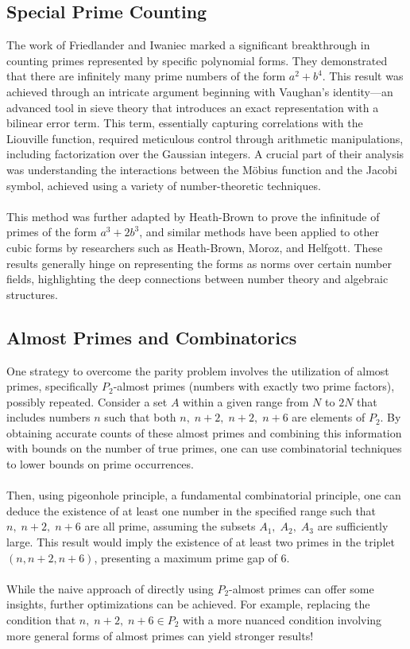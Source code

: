 \documentclass[10pt]{extarticle}
\begin{document}
\subsection{Special Prime Counting}
The work of Friedlander and Iwaniec marked a significant breakthrough in counting primes represented by specific polynomial forms. They demonstrated that there are infinitely many prime numbers of the form $a^2 + b^4$. 
This result was achieved through an intricate argument beginning with Vaughan’s identity—an advanced tool in sieve theory that introduces an exact representation with a bilinear error term. This term, essentially capturing correlations with the Liouville function, required meticulous control through arithmetic manipulations, including factorization over the Gaussian integers. A crucial part of their analysis was understanding the interactions between the Möbius function and the Jacobi symbol, achieved using a variety of number-theoretic techniques.\\
\\
This method was further adapted by Heath-Brown to prove the infinitude of primes of the form $a^3 + 2b^3$, and similar methods have been applied to other cubic forms by researchers such as Heath-Brown, Moroz, and Helfgott. These results generally hinge on representing the forms as norms over certain number fields, highlighting the deep connections between number theory and algebraic structures.



\subsection{Almost Primes and Combinatorics}
One strategy to overcome the parity problem involves the utilization of almost primes, specifically $P_2$-almost primes (numbers with exactly two prime factors), possibly repeated. Consider a set 
$A$ within a given range from $N$ to $2N$ that includes numbers $n$ such that both $n, \;n+2, \;
n+2, \;n+6$ are elements of $P_2$. By obtaining accurate counts of these almost primes and combining this information with bounds on the number of true primes, one can use combinatorial techniques to lower bounds on prime occurrences.\\
\\
Then, using pigeonhole principle, a fundamental combinatorial principle, one can deduce the existence of at least one number in the specified range such that $n, \;n+2, \;n+6$ are all prime, assuming the subsets 
$A_1, \;A_2,\;A_3$ are sufficiently large. This result would imply the existence of at least two primes in the triplet $(n,n+2,n+6)$, presenting a maximum prime gap of $6$. \\
\\
While the naive approach of directly using $P_2$-almost primes can offer some insights, further optimizations can be achieved. For example, replacing the condition that $n, \; n+2, \;n+6 \in P_2$ with a more nuanced condition involving more general forms of almost primes can yield stronger results!
\end{document}
